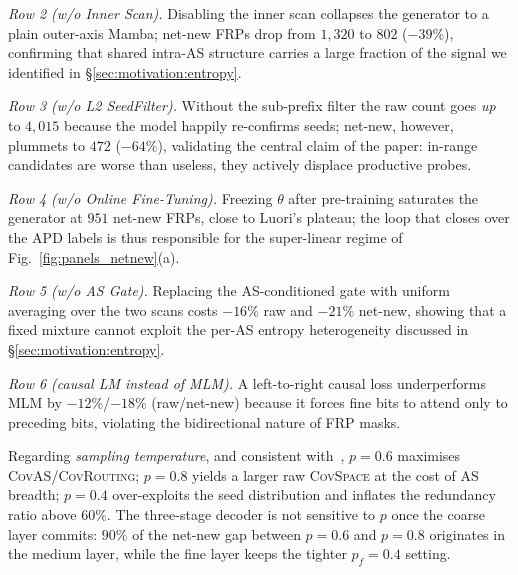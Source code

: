 \documentclass[conference]{IEEEtran}
\begin{document}
\emph{Row 2 (w/o Inner Scan).}  Disabling the inner scan
collapses the generator to a plain outer-axis Mamba; net-new
FRPs drop from $1{,}320$ to $802$ ($-39\%$), confirming that
shared intra-AS structure carries a large fraction of the
signal we identified in \S\ref{sec:motivation:entropy}.

\emph{Row 3 (w/o L2 SeedFilter).}  Without the sub-prefix filter
the raw count goes \emph{up} to $4{,}015$ because the model
happily re-confirms seeds; net-new, however, plummets to $472$
($-64\%$), validating the central claim of the paper: in-range
candidates are worse than useless, they actively displace
productive probes.

\emph{Row 4 (w/o Online Fine-Tuning).}  Freezing $\theta$ after
pre-training saturates the generator at $951$ net-new FRPs,
close to Luori's plateau; the loop that closes over the APD
labels is thus responsible for the super-linear regime of
Fig.~\ref{fig:panels_netnew}(a).

\emph{Row 5 (w/o AS Gate).}  Replacing the AS-conditioned gate
with uniform averaging over the two scans costs $-16\%$ raw and
$-21\%$ net-new, showing that a fixed mixture cannot exploit
the per-AS entropy heterogeneity discussed in \S\ref{sec:motivation:entropy}.

\emph{Row 6 (causal LM instead of MLM).}  A left-to-right
causal loss underperforms MLM by $-12\%$/$-18\%$ (raw/net-new)
because it forces fine bits to attend only to preceding bits,
violating the bidirectional nature of FRP masks.

Regarding \emph{sampling temperature}, and consistent
with~\cite{wei2025gungnir}, $p{=}0.6$ maximises
\textsc{CovAS}/\textsc{CovRouting}; $p{=}0.8$ yields a larger
raw \textsc{CovSpace} at the cost of AS breadth; $p{=}0.4$
over-exploits the seed distribution and inflates the redundancy
ratio above $60\%$.  The three-stage decoder is not sensitive
to $p$ once the coarse layer commits: $90\%$ of the net-new gap
between $p{=}0.6$ and $p{=}0.8$ originates in the medium layer,
while the fine layer keeps the tighter $p_f{=}0.4$ setting.
\end{document}
